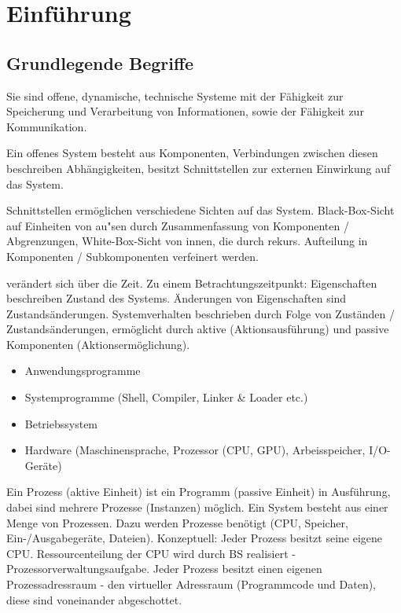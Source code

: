 \section{Einführung}

\subsection{Grundlegende Begriffe}
Sie sind offene, dynamische, technische Systeme mit der Fähigkeit zur Speicherung und Verarbeitung von Informationen, sowie der Fähigkeit zur Kommunikation.

Ein offenes System besteht aus Komponenten, Verbindungen zwischen diesen beschreiben Abhängigkeiten, besitzt Schnittstellen zur externen Einwirkung auf das System.

Schnittstellen ermöglichen verschiedene Sichten auf das System. Black-Box-Sicht auf Einheiten von au"sen durch Zusammenfassung von Komponenten / Abgrenzungen, White-Box-Sicht von innen, die durch rekurs. Aufteilung in Komponenten / Subkomponenten verfeinert werden.

 verändert sich über die Zeit. Zu einem Betrachtungszeitpunkt: Eigenschaften beschreiben Zustand des Systems. Änderungen von Eigenschaften sind Zustands\-änderungen. System\-verhalten beschrieben durch Folge von Zuständen / Zustandsänderungen, ermöglicht durch aktive (Aktionsausführung) und passive Komponenten (Aktionsermöglichung).

\begin{itemize} 	\setlength\itemsep{0em}
	\item Anwendungsprogramme
	\item Systemprogramme (Shell, Compiler, Linker \& Loader etc.)
	\item Betriebssystem
	\item Hardware (Maschinensprache, Prozessor (CPU, GPU), Arbeisspeicher, I/O-Geräte)
\end{itemize}

Ein Prozess (aktive Einheit) ist ein Programm (passive Einheit) in Ausführung, dabei sind mehrere Prozesse (Instanzen) möglich. Ein System besteht aus einer Menge von Prozessen. Dazu werden Prozesse benötigt (CPU, Speicher, Ein-/Ausgabegeräte, Dateien). Konzeptuell: Jeder Prozess besitzt seine eigene CPU. Ressourcenteilung der CPU wird durch BS realisiert - Prozessorverwaltungsaufgabe. Jeder Prozess besitzt einen eigenen Prozessadressraum - den virtueller Adressraum (Programmcode und Daten), diese sind voneinander abgeschottet.

